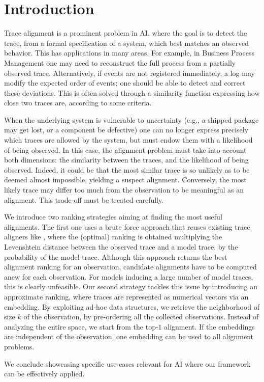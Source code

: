 
\section{Introduction}
\label{introduction}

Trace alignment is a prominent problem in AI, where the goal is to detect the trace, from a formal specification of a system,
which best matches an observed behavior. This has applications in many areas. For example, in Business Process Management
one may need to reconstruct the full process from a partially observed trace. Alternatively, if events are not registered immediately,
a log may modify the expected order of events; one should be able to detect and correct these deviations. This is often solved
through a similarity function expressing how close two traces are, according to some criteria.

When the underlying system is vulnerable to uncertainty (e.g., a shipped package may get lost, or a component be defective)
one can no longer express precisely which traces are allowed by the system, but must endow them with a likelihood
of being observed. In this case, the alignment problem must take into account both dimensions: the similarity between the
traces, and the likelihood of being observed. Indeed, it could be that the most similar trace is so unlikely as to be deemed almost
impossible, yielding a suspect alignment. Conversely, the most likely trace may differ too much from the observation to be
meaningful as an alignment. This trade-off must be treated carefully.

We introduce two ranking strategies aiming at finding the most useful alignments. The first one uses a brute force approach that
reuses existing trace aligners like \cite{DBLP:conf/edoc/AdriansyahDA11,LeoniM17}, where the (optimal) ranking
is obtained multiplying the Levenshtein distance between the observed trace and a model trace, by the probability of the
model trace. Although this approach returns the best alignment ranking for an observation, candidate alignments have to be computed
anew for each observation. For models inducing a large number of model traces, this is clearly unfeasible. Our second
strategy tackles this issue by introducing an approximate ranking, where traces are represented as numerical vectors via an embedding.
By exploiting ad-hoc data structures, we retrieve the neighborhood of size $k$ of the observation, by pre-ordering all the collected observations. Instead of analyzing the entire space, we start from the top-$1$ alignment. If the embeddings are
independent of the observation, one embedding can be used to all alignment problems.

We conclude showcasing specific use-cases relevant for AI where our framework can be effectively applied. 